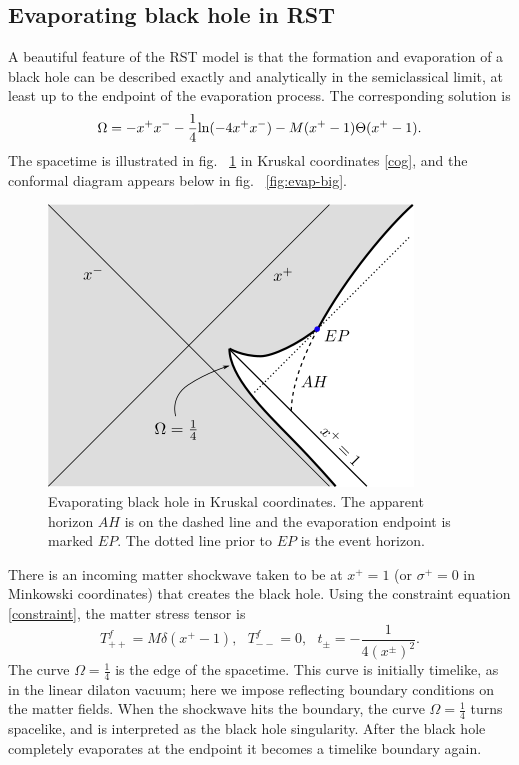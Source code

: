 \documentclass[11pt,oneside,letterpaper]{article}
\newcommand{\be}{\begin{equation}}
\newcommand{\ee}{\end{equation}}
\def\be{\begin{eqnarray}}
\def\ee{\end{eqnarray}}
\def\be{\begin{equation}}
\def\ee{\end{equation}}
\def\m{{M}}
\def\log{{\rm ln}}
\numberwithin{equation}{section}
\def \be {\begin{equation}}
\def \ee {\end{equation}}
\begin{document}
\subsection{Evaporating black hole in RST}
A beautiful feature of the RST model is that the  formation and evaporation of a black hole can be described exactly and analytically in the semiclassical limit, at least up to the endpoint of the evaporation process. The corresponding solution is
\be\label{omegaevap}
\Omega = - x^+ x^- - \frac{1}{4}\log(-4 x^+ x^-) - \m(x^+ - 1) \Theta(x^+ -1 ) .
\ee
The spacetime is illustrated in fig. ~\ref{fig:evapX} in Kruskal coordinates \eqref{cog}, and the conformal diagram appears below in fig. ~\ref{fig:evap-big}.
\begin{figure}
\begin{center}
\includegraphics[scale=1.0]{figures/evapX.png}
\end{center}
\caption{\small Evaporating black hole in Kruskal coordinates. The apparent horizon $AH$ is on the dashed line and the evaporation endpoint is marked $EP$. The dotted line prior to $EP$ is the event horizon. \label{fig:evapX}}
\end{figure}
There is an incoming matter shockwave taken to be at $x^+ = 1$ (or $\sigma^+=0$ in Minkowski coordinates) that creates the black hole. Using the constraint equation \eqref{constraint}, the matter stress tensor is 
\be T^f_{++}=\m \delta(x^+ - 1), ~~~T^f_{--}=0, ~~~t_\pm = -\frac{1}{4(x^\pm)^2}.\ee
The curve $\Omega = \frac{1}{4}$ is the edge of the spacetime. This curve is initially timelike, as in the linear dilaton vacuum; here we impose reflecting boundary conditions on the matter fields. When the shockwave hits the boundary, the curve $\Omega = \frac{1}{4}$ turns spacelike, and is interpreted as the black hole singularity.  After the black hole completely evaporates at the endpoint it becomes a timelike boundary again. 
\end{document}
